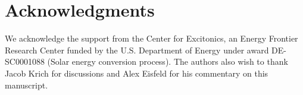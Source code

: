 \section{Acknowledgments}
We acknowledge the support from the Center for Excitonics, an Energy Frontier Research Center funded by the U.S. Department of Energy under award DE-SC0001088 (Solar energy conversion process).  The authors also wish to thank Jacob Krich for discussions and Alex Eisfeld for his commentary on this manuscript.

